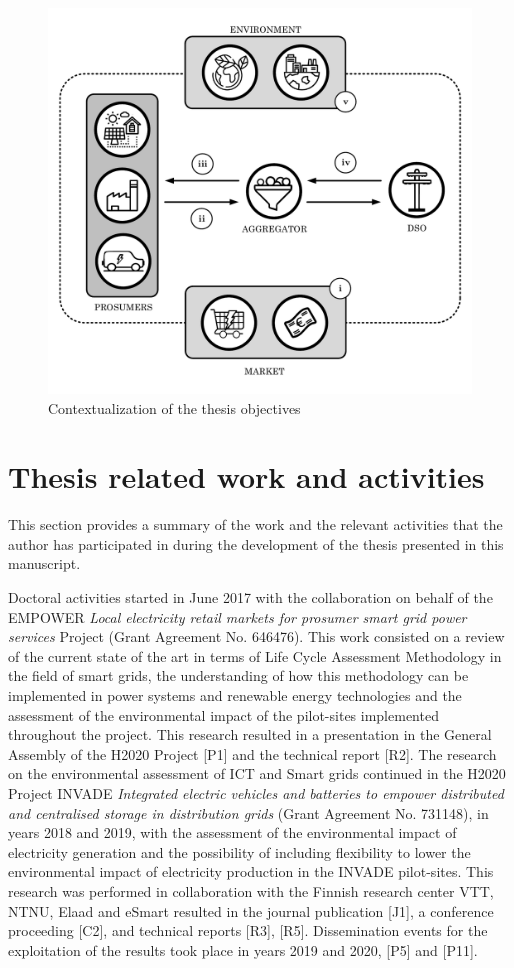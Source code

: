 \begin{figure}[h]
	\centering 
	\includegraphics[width=0.75\columnwidth ]{ChapterIntro/Figures/objectives_figure_2.pdf}
		\caption{Contextualization of the thesis objectives}  
		\label{fig:objectives}
\end{figure}




\newpage 
\section{Thesis related work and activities}
This section provides a summary of the work and the relevant activities that the author has participated in during the development of the thesis presented in this manuscript. 
 	
Doctoral activities started in June 2017 with the collaboration on behalf of the EMPOWER \textit{Local electricity retail markets for prosumer smart grid power services } Project (Grant Agreement No. 646476). This work consisted on a review of the current state of the art in terms of Life Cycle Assessment Methodology in the field of smart grids, the understanding of how this methodology can be implemented in power systems and renewable energy technologies and the assessment of the environmental impact of the pilot-sites implemented throughout the project. This research resulted in a presentation in the General Assembly of the H2020 Project [P1] and the technical report [R2]. The research on the environmental assessment of ICT and Smart grids continued in the H2020 Project INVADE \textit{Integrated electric vehicles and batteries to empower distributed and centralised storage in distribution grids} (Grant Agreement No. 731148), in years  2018 and 2019, with the assessment of the environmental impact of electricity generation and the possibility of including flexibility to lower the environmental impact of electricity production in the INVADE pilot-sites. This research was performed in collaboration with the Finnish research center VTT, NTNU, Elaad and eSmart resulted in the journal publication [J1], a conference proceeding [C2], and technical reports [R3], [R5]. Dissemination events for the exploitation of the results took place in years 2019 and 2020, [P5] and [P11]. 

